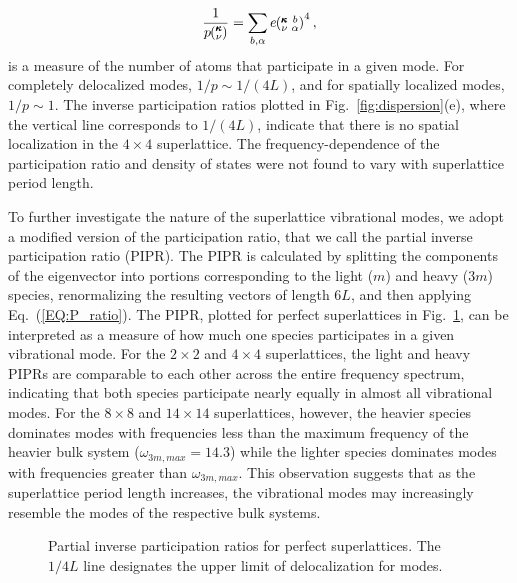 \documentclass[aps,prb,preprint,preprintnumbers,amsmath,amssymb,floatfix,superscriptaddress]{revtex4}
\newcommand{\kvba}{\mspace{-4.0mu}\left(\mspace{-8.0mu}
\begin{smallmatrix} &\pmb{\kappa} &b \\ &\nu &\alpha\end{smallmatrix}
\mspace{-3.0mu}\right)}
\newcommand{\kv}{\mspace{-4.0mu}\left(\mspace{-8.0mu}
\begin{smallmatrix}&\pmb{\kappa} \\&\nu\end{smallmatrix}
\mspace{-3.0mu}\right)}
\begin{document}
\begin{equation}\label{EQ:P_ratio}
\begin{split}
\frac{1}{p\kv}=\sum_{b,\alpha}e\kvba^4,
\end{split}
\end{equation}
is a measure of the number of atoms that participate in a given mode. For completely delocalized modes, $1/p\sim 1/(4L)$, and for spatially localized modes, $1/p\sim 1$.\cite{PhysRevB.70.235214} The inverse participation ratios plotted in Fig.~\ref{fig:dispersion}(e), where the vertical line corresponds to $1/(4L)$, indicate that there is no spatial localization in the $4\times4$ superlattice. The frequency-dependence of the participation ratio and density of states were not found to vary with superlattice period length.

To further investigate the nature of the superlattice vibrational modes, we adopt a modified version of the participation ratio, that we call the partial inverse participation ratio (PIPR). The PIPR is calculated by splitting the components of the eigenvector into portions corresponding to the light ($m$) and heavy ($3m$) species, renormalizing the resulting vectors of length $6L$, and then applying Eq.~(\ref{EQ:P_ratio}). The PIPR, plotted for perfect superlattices in Fig.~\ref{FIG:ipnum}, can be interpreted as a measure of how much one species participates in a given vibrational mode. For the $2 \times 2$ and $4 \times 4$ superlattices, the light and heavy PIPRs are comparable to each other across the entire frequency spectrum, indicating that both species participate nearly equally in almost all vibrational modes. For the $8 \times 8$ and $14 \times 14$ superlattices, however, the heavier species dominates modes with frequencies less than the maximum frequency of the heavier bulk system ($\omega_{3m,max}=14.3$) while the lighter species dominates modes with frequencies greater than $\omega_{3m,max}$. This observation suggests that as the superlattice period length increases, the vibrational modes may increasingly resemble the modes of the respective bulk systems. %
\begin{figure}[h!]
\begin{center}
\renewcommand{\figure}{Fig.}
\caption{Partial inverse participation ratios for perfect superlattices. The $1/4L$ line designates the upper limit of delocalization for modes.}
\label{FIG:ipnum}
\end{center}
\end{figure}
\end{document}
